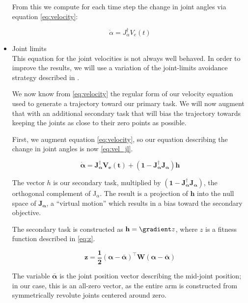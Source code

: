 \documentclass[10pt, conference]{IEEEtran}
\begin{document}
\begin{itemize}
     From this we compute for each time step the change in joint angles
     via equation \ref{eq:velocity}:

     \begin{equation}
     \label{eq:velocity}
     \dot{\alpha} = J_{\alpha}^{\dagger}V_e(t)
     \end{equation}


\item Joint limits\\
\label{sec-3-3-1-3}%
This equation for the joint velocities is not always well
     behaved. In order to improve the results, we will use a variation
     of the joint-limits avoidance strategy described in
     \cite{luc_baron}.

     We now know from \ref{eq:velocity} the regular form of our
     velocity equation used to generate a trajectory toward our primary
     task. We will now augment that with an additional secondary task
     that will bias the trajectory towards keeping the joints as close
     to their zero points as possible.

     First, we augment equation \ref{eq:velocity}, so our equation
     describing the change in joint angles is now \ref{eq:vel_jl}.

     \begin{equation}
     \label{eq:vel_jl}
     \mathbf{\dot{\alpha} = J_{\alpha}^{\dagger}V_e(t) + (1 -
     J_{\alpha}^{\dagger}J_{\alpha})h}
     \end{equation}

     The vector \(h\) is our secondary task, multiplied by \(\mathbf{
     (1 - J_{\alpha}^{\dagger}J_{\alpha})}\), the orthogonal complement
     of J$_{\alpha}$. The result is a projection of \(\mathbf{h}\) into
     the null space of \(\mathbf{J_\alpha}\), a ``virtual motion'' which
     results in a bias toward the secondary objective.

     The secondary task is constructed as  \(\mathbf{h} = \gradient z\),
     where \(z\) is a fitness function described in \ref{eq:z}.

     \begin{equation}
     \label{eq:z}
     \mathbf{ z = \frac{1}{2}(\alpha - \bar{\alpha})^{\top}W(\alpha -
     \bar{\alpha})}
     \end{equation}

     The variable \(\mathbf{\bar{\alpha}}\) is the joint position vector
     describing the mid-joint position; in our case, this is an all-zero
     vector, as the entire arm is constructed from symmetrically
     revolute joints centered around zero.


\end{itemize}
\end{document}
